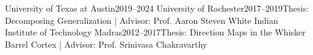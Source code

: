     {University of Texas at Austin}{2019--2024}{}{}
    {University of Rochester}{2017--2019}{Thesis: Decomposing Generalization | Advisor: Prof. Aaron Steven White}{}
    {Indian Institute of Technology Madras}{2012--2017}{Thesis: Direction Maps in the Whisker Barrel Cortex | Advisor: Prof. Srinivasa Chakravarthy}{}